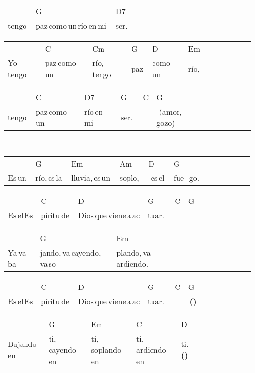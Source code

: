 \begin{multicols}{2}
\begin{minipage}{\columnwidth}
\noindent
\begin{tabular}{llllllllllll}
&G&D7\\
tengo\,&paz\,como\,un\,río\,en\,mi\,&ser.
\end{tabular}

\noindent
\begin{tabular}{llllllllllll}
&C&Cm&G&D&Em\\
Yo\,tengo\,&paz\,como\,un\,&río,\,tengo\,&paz\,&como\,un\,&río,
\end{tabular}

\noindent
\begin{tabular}{llllllllllll}
&C&D7&G&C&G\\
tengo\,&paz\,como\,un\,&río\,en\,mi\,&ser.\,\,&\quad\,&\,\quad\,(amor,\,gozo)
\end{tabular}
\end{minipage}\\

\noindent
\begin{minipage}{\columnwidth}
\noindent
\noindent
\begin{tabular}{llllllllllll}
&G&Em&Am&D&G\\
Es\,un\,&río,\,es\,la\,&lluvia,\,es\,un\,&soplo,\,&\,\,es\,el\,&fue\,-\,go.
\end{tabular}

\noindent
\begin{tabular}{llllllllllll}
&C&D&G&C&G\\
Es\,el\,Es&píritu\,de\,&Dios\,que\,viene\,a\,ac&tuar.\,\,&\quad\,&\\\hline
\end{tabular}

\noindent
\begin{tabular}{llllllllllll}
&G&Em\\
Ya\,va\,ba&jando,\,va\,cayendo,\,va\,so&plando,\,va\,ardiendo.
\end{tabular}

\noindent
\begin{tabular}{llllllllllll}
&C&D&G&C&G\\
Es\,el\,Es&píritu\,de\,&Dios\,que\,viene\,a\,ac&tuar.\,\,&\quad\,&\,\textbf{(\texttimes2)}\\\hline
\end{tabular}

\noindent
\begin{tabular}{llllllllllll}
&G&Em&C&D\\
Bajando\,en\,&ti,\,cayendo\,en\,&ti,\,soplando\,en\,&ti,\,ardiendo\,en\,&ti.\,\textbf{(\texttimes2)}
\end{tabular}


\end{minipage}
\end{multicols}
